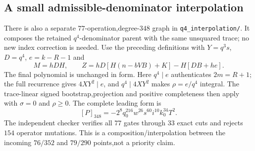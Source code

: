 \subsection{A small admissible-denominator interpolation}
There is also a separate $77$-operation,degree-$348$ graph in
\texttt{q4\_interpolation/}.  It composes the retained $q^4$-denominator
parent with the same unsquared trace; no new index correction is needed.
Use the preceding definitions with $Y=q^3s$, $D=q^4$, $e=k-R-1$ and
\[
 M=hDH,\qquad Z=hD[H(n-bVB)+K]-H[DB+he].
\]
The final polynomial is unchanged in form.  Here $q^4\mid e$ authenticates
$2m=R+1$; the full recurrence gives $4XY^2\mid e$, and
$q^4\mid4XY^2$ makes $\rho=e/q^4$ integral.  The trace-linear signed
bootstrap,projection and positive completeness then apply with $\sigma=0$
and $\rho\ge0$.  The complete leading form is
\[
 [P]_{348}=-2^8q_0^{216}w^{26}s^{60}i^{10}k_0^{34}T^2.
\]
The independent checker verifies all $77$ gates through $33$ exact cuts
and rejects $154$ operator mutations.  This is a composition/interpolation
between the incoming $76/352$ and $79/290$ points,not a priority claim.
